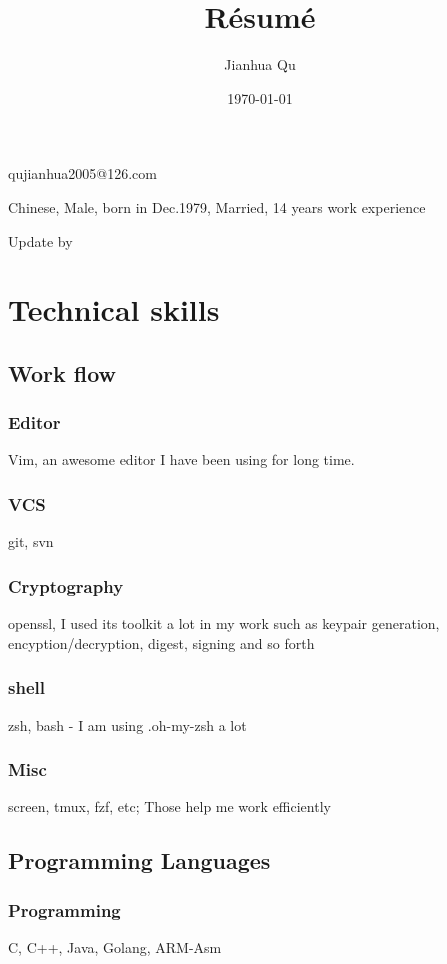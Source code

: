\documentclass{article}
\makeatletter
\renewcommand{\maketitle}{
\begin{center}

{\huge\bfseries\theauthor}

\vspace{.25em}
qujianhua2005@126.com


\vspace{.25em}
Chinese, Male, born in Dec.1979, Married, 14 years work experience

\vspace{.25em}
Update by \thedate

\end{center}
}
\makeatother
\begin{document}
\title {R\'esum\'e}
\author {Jianhua Qu}
\date{\today}

\maketitle

\section{Technical skills}

\subsection{Work flow}
\subsubsection{Editor}
Vim, an awesome editor I have been using for long time.

\subsubsection{VCS}
git, svn

\subsubsection{Cryptography}
openssl, I used its toolkit a lot in my work such as keypair generation,
        encyption/decryption, digest, signing and so forth

\subsubsection{shell}
zsh, bash - I am using .oh-my-zsh a lot

\subsubsection{Misc}
screen, tmux, fzf, etc;
Those help me work efficiently

\subsection{Programming Languages}

\subsubsection{Programming}
C, C++, Java, Golang, ARM-Asm
\end{document}

